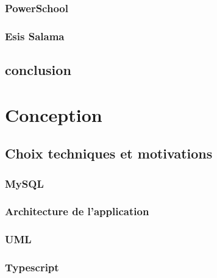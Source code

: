 \documentclass[12pt, a4paper]{report}
\begin{document}
    \subsection{PowerSchool}\label{subsec:powerschool}
    

    \subsection{Esis Salama}\label{subsec:esis-salamae}
    

    \section{conclusion}\label{sec:conclusion}
    

    \chapter{Conception}\label{sec:conception}
    

    \section{Choix techniques et motivations}\label{sec:choix-techniques-et-motivation}
    \subsection{MySQL}\label{subsec:mysql}
    

    \subsection{Architecture de l'application}\label{sec:application-architecture}
    

    \subsection{UML}\label{sec:modeling-uml}
    

    \subsection{Typescript}\label{sec:typescript}
    
\end{document}
